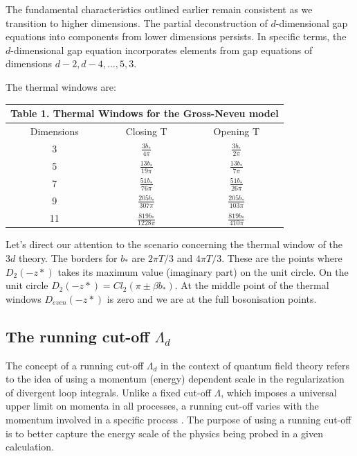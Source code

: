 \documentclass[twoside]{article}
\begin{document}
The fundamental characteristics outlined earlier remain consistent as we transition to higher dimensions. The partial deconstruction of $d$-dimensional gap equations into components from lower dimensions persists. In specific terms, the $d$-dimensional gap equation incorporates elements from gap equations of dimensions $d-2, d-4,...,5,3$.

The thermal windows are:\\
	
	{\centering
		\begin{tabular}{|c|c|c|}
			\hline 
			\multicolumn{3}{|c|}{\textbf{Table 1. Thermal Windows for the Gross-Neveu model}} \\ 
			\hline 
			Dimensions & Closing T & Opening T \\ 
                        \hline
                        3 & $\frac{3b_*}{4\pi}$ & $\frac{3b_*}{2\pi}$\\
			\hline 
			5 & $\frac{13b_*}{19\pi}$ & $\frac{13b_*}{7\pi}$ \\ 
			\hline 
			7 & $\frac{51b_*}{76\pi}$ & $\frac{51b_*}{26\pi}$ \\ 
			\hline 
			9 & $\frac{205b_*}{307\pi}$ & $\frac{205b_*}{103\pi}$ \\ 
			\hline 
			11 & $\frac{819b_*}{1228\pi}$ & $\frac{819b_*}{410\pi}$ \\ 
			\hline 
		\end{tabular}\par} 

Let's direct our attention to the scenario concerning the thermal window of the $3d$ theory. The borders for $b_*$ are $2\pi T/3$ and $4\pi T/3$. These are the points where $D_2(-z*)$ \cite{Zagier1, Zagier2} takes its maximum value (imaginary part) on the unit circle. On the unit circle $D_2(-z*)=Cl_2(\pi\pm\beta b_*)$. At the middle point of the thermal windows $D_{even}(-z*)$ is zero and we are at the full bosonisation points.

\subsection{The running cut-off $\Lambda_d$}

The concept of a running cut-off $\Lambda_d$ in the context of quantum field theory refers to the idea of using a momentum (energy) dependent scale in the regularization of divergent loop integrals. Unlike a fixed cut-off $\Lambda$, which imposes a universal upper limit on momenta in all processes, a running cut-off varies with the momentum involved in a specific process \cite{Litim, Chu, Epelbaum, Barlas}. The purpose of using a running cut-off is to better capture the energy scale of the physics being probed in a given calculation.
\end{document}
